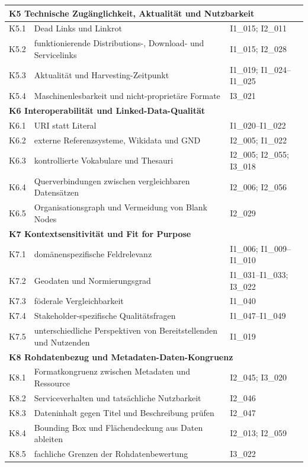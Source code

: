 \begin{table}[H]
\begin{tabular}{p{1cm} p{8.8cm} p{2.5cm}}
\multicolumn{3}{l}{\textbf{K5 Technische Zugänglichkeit, Aktualität und Nutzbarkeit}} \\
\midrule
K5.1 & Dead Links und Linkrot & I1\_015; I2\_011 \\ \hline
K5.2 & funktionierende Distributions-, Download- und Servicelinks & I1\_015; I2\_028 \\ \hline
K5.3 & Aktualität und Harvesting-Zeitpunkt & I1\_019; I1\_024--I1\_025 \\ \hline
K5.4 & Maschinenlesbarkeit und nicht-proprietäre Formate & I3\_021 \\
\midrule

\multicolumn{3}{l}{\textbf{K6 Interoperabilität und Linked-Data-Qualität}} \\
\midrule
K6.1 & URI statt Literal & I1\_020--I1\_022 \\ \hline
K6.2 & externe Referenzsysteme, Wikidata und GND & I2\_005; I1\_022 \\ \hline
K6.3 & kontrollierte Vokabulare und Thesauri & I2\_005; I2\_055; I3\_018 \\ \hline
K6.4 & Querverbindungen zwischen vergleichbaren Datensätzen & I2\_006; I2\_056 \\ \hline
K6.5 & Organisationsgraph und Vermeidung von Blank Nodes & I2\_029 \\
\midrule

\multicolumn{3}{l}{\textbf{K7 Kontextsensitivität und Fit for Purpose}} \\
\midrule
K7.1 & domänenspezifische Feldrelevanz & I1\_006; I1\_009--I1\_010 \\ \hline
K7.2 & Geodaten und Normierungsgrad & I1\_031--I1\_033; I3\_022 \\ \hline
K7.3 & föderale Vergleichbarkeit & I1\_040 \\ \hline
K7.4 & Stakeholder-spezifische Qualitätsfragen & I1\_047--I1\_049 \\ \hline
K7.5 & unterschiedliche Perspektiven von Bereitstellenden und Nutzenden & I1\_019 \\
\midrule

\multicolumn{3}{l}{\textbf{K8 Rohdatenbezug und Metadaten-Daten-Kongruenz}} \\
\midrule
K8.1 & Formatkongruenz zwischen Metadaten und Ressource & I2\_045; I3\_020 \\ \hline
K8.2 & Serviceverhalten und tatsächliche Nutzbarkeit & I2\_046 \\ \hline
K8.3 & Dateninhalt gegen Titel und Beschreibung prüfen & I2\_047 \\ \hline
K8.4 & Bounding Box und Flächendeckung aus Daten ableiten & I2\_013; I2\_059 \\ \hline
K8.5 & fachliche Grenzen der Rohdatenbewertung & I3\_022 \\
\midrule


\end{tabular}
\end{table}
